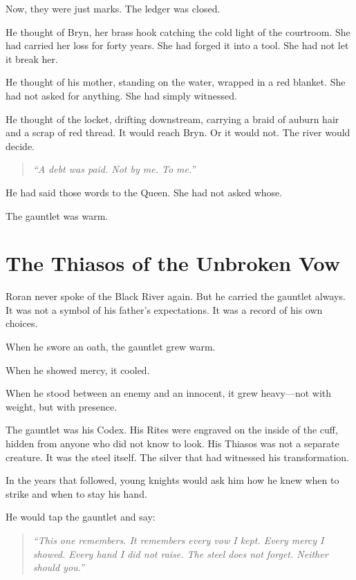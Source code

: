 Now, they were just marks. The ledger was closed.

He thought of Bryn, her brass hook catching the cold light of the courtroom. She had carried her loss for forty years. She had forged it into a tool. She had not let it break her.

He thought of his mother, standing on the water, wrapped in a red blanket. She had not asked for anything. She had simply witnessed.

He thought of the locket, drifting downstream, carrying a braid of auburn hair and a scrap of red thread. It would reach Bryn. Or it would not. The river would decide.

\begin{quote}
\textit{``A debt was paid. Not by me. To me.''}
\end{quote}

He had said those words to the Queen. She had not asked whose.

The gauntlet was warm.

\section*{The Thiasos of the Unbroken Vow}

Roran never spoke of the Black River again. But he carried the gauntlet always. It was not a symbol of his father's expectations. It was a record of his own choices.

When he swore an oath, the gauntlet grew warm.

When he showed mercy, it cooled.

When he stood between an enemy and an innocent, it grew heavy—not with weight, but with presence.

The gauntlet was his Codex. His Rites were engraved on the inside of the cuff, hidden from anyone who did not know to look. His Thiasos was not a separate creature. It was the steel itself. The silver that had witnessed his transformation.

In the years that followed, young knights would ask him how he knew when to strike and when to stay his hand.

He would tap the gauntlet and say:

\begin{quote}
\textit{``This one remembers. It remembers every vow I kept. Every mercy I showed. Every hand I did not raise. The steel does not forget. Neither should you.''}
\end{quote}

